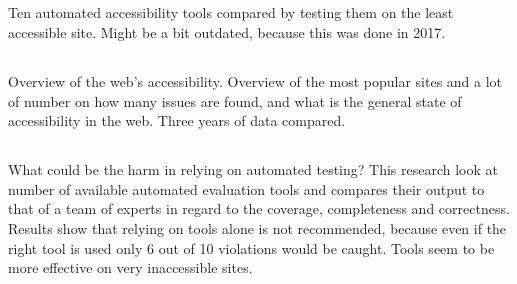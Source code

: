 \documentclass{master_thesis}
\begin{document}
\subsection*{\cite{Duran2017}}
Ten automated accessibility tools compared by testing them on the least accessible site. Might be a bit outdated, because this was done in 2017.
\subsection*{\cite{WebAIM2022}}
Overview of the web's accessibility. Overview of the most popular sites and a lot of number on how many issues are found, and what is the general state of accessibility in the web. Three years of data compared.
\subsection*{\cite{Vigo2013}}
What could be the harm in relying on automated testing? This research look at number of available automated evaluation tools and compares their output to that of a team of experts in regard to the coverage, completeness and correctness. Results show that relying on tools alone is not recommended, because even if the right tool is used only 6 out of 10 violations would be caught. Tools seem to be more effective on very inaccessible sites.

\printbibliography
\end{document}
